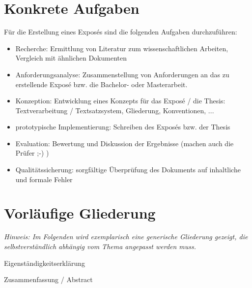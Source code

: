 \documentclass[11pt]{scrartcl}
\newcommand{\bzw}{bzw.\xspace}
\begin{document}
\pagebreak

\section{Konkrete Aufgaben}

Für die Erstellung eines Exposés sind die folgenden Aufgaben durchzuführen:

\begin{itemize}
	\item Recherche: Ermittlung von Literatur zum wissenschaftlichen Arbeiten, Vergleich mit ähnlichen Dokumenten
 	\item Anforderungsanalyse: Zusammenstellung von Anforderungen an das zu erstellende Exposé \bzw die Bachelor- oder Masterarbeit.
 	\item Konzeption: Entwicklung eines Konzepts für das Exposé / die Thesis: Textverarbeitung / Textsatzsystem, Gliederung, Konventionen, ...
 	\item prototypische Implementierung: Schreiben des Exposés \bzw der Thesis
 	\item Evaluation: Bewertung und Diskussion der Ergebnisse (machen auch die Prüfer ;-) )
 	\item Qualitätssicherung: sorgfältige Überprüfung des Dokuments auf inhaltliche und formale Fehler
\end{itemize}


\section{\label{sec:gliederung}Vorläufige Gliederung}

{\small
\emph{Hinweis: Im Folgenden wird exemplarisch eine \emph{generische} Gliederung gezeigt, die selbstverständlich abhängig vom Thema angepasst werden muss.}
}

{\parindent=5mm 
Eigenständigkeitserklärung

Zusammenfassung / Abstract}
\end{document}

